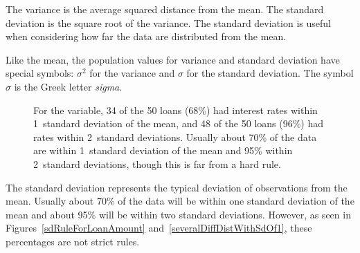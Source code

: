 \begin{termBox}{
  The variance is the average squared distance from the mean.
  The standard deviation is the square root of the variance.
  The standard deviation is useful when considering how far
  the data are distributed from the mean.}
\end{termBox}

Like the mean, the population values for variance
and standard deviation have special symbols:
$\sigma_{}^2$ for the variance and $\sigma$ for the
standard deviation.
The symbol $\sigma$ 
is the Greek letter \emph{sigma}.

\begin{figure}
  \centering
  \caption{For the  variable,
      34 of the 50 loans (68\%) had interest rates within
      1~standard deviation of the mean,
      and 48 of the 50 loans (96\%) had rates within
      2~standard deviations.
      Usually about 70\% of the data are within 1~standard
      deviation of the mean and 95\% within 2~standard
      deviations, though this is far from a hard rule.}
  \label{sdRuleForIntRate}
\end{figure}


\begin{termBox}{
  The standard deviation represents the typical deviation
  of observations from the mean.
  Usually about 70\% of the data will be within one standard
  deviation of the mean and about 95\% will be within two
  standard deviations.
  However, as seen in Figures~\ref{sdRuleForLoanAmount}
  and~\ref{severalDiffDistWithSdOf1}, these percentages are
  not strict rules.}
\end{termBox}

